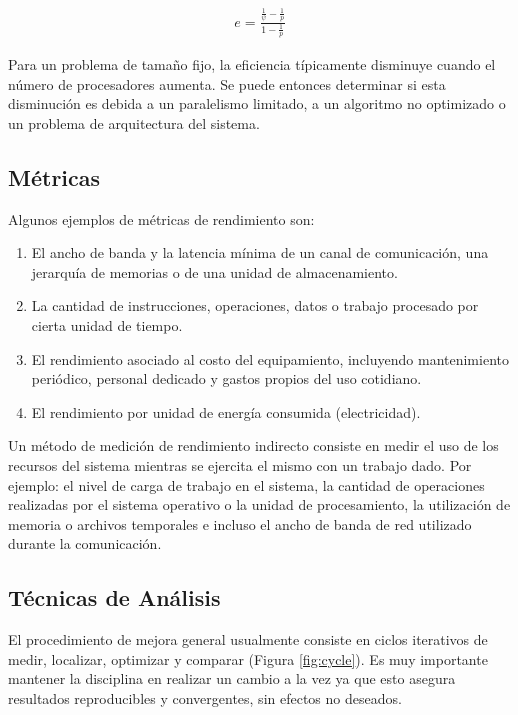\documentclass[a4paper]{report}
\begin{document}
\begin{eqnarray}
\label{eq:karp-flatt}
 e = \frac{\frac{1}{\psi} - \frac{1}{p}}{1 - \frac{1}{p}} 
\end{eqnarray}

Para un problema de tamaño fijo, la eficiencia típicamente disminuye cuando el número de procesadores aumenta. Se puede entonces determinar si esta disminución es debida a un paralelismo limitado, a un algoritmo no optimizado o un problema de arquitectura del sistema.

\subsection{Métricas}

Algunos ejemplos de métricas de rendimiento son:

\begin{enumerate}
\item El ancho de banda y la latencia mínima de un canal de comunicación,
  una jerarquía de memorias o de una unidad de almacenamiento.
\item La cantidad de instrucciones, operaciones, datos o trabajo procesado
  por cierta unidad de tiempo.
\item El rendimiento asociado al costo del equipamiento, incluyendo mantenimiento
 periódico, personal dedicado y gastos propios del uso cotidiano.
\item El rendimiento por unidad de energía consumida (electricidad).

\end{enumerate}

Un método de medición de rendimiento indirecto consiste en medir el uso de
los recursos del sistema mientras se ejercita el mismo con un trabajo dado.
Por ejemplo: el nivel de carga de trabajo en el sistema, la cantidad de operaciones realizadas por el
sistema operativo o la unidad de procesamiento, la utilización de memoria o
archivos temporales e incluso el ancho de banda de red utilizado durante la comunicación.

\subsection{Técnicas de Análisis}

El procedimiento de mejora general usualmente consiste en ciclos iterativos de medir, localizar, optimizar y
comparar (Figura \ref{fig:cycle}). Es muy importante mantener la disciplina en realizar un cambio a la
vez ya que esto asegura resultados reproducibles y convergentes, sin efectos no deseados.
\end{document}
